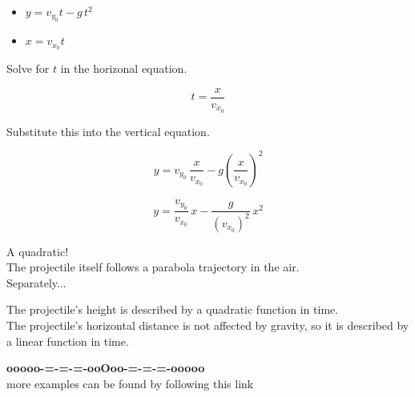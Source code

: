 \documentclass{ximera}
\begin{document}
\begin{itemize}
\item $y = v_{y_0} t - g \, t^2$


\item $x = v_{x_0} t$
\end{itemize}


Solve for $t$ in the horizonal equation.


\[ t = \frac{x}{v_{x_0}} \]

Substitute this into the vertical equation.


\[  y = v_{y_0} \, \frac{x}{v_{x_0}} - g \left(\frac{x}{v_{x_0}}\right)^2  \]



\[  y = \frac{v_{y_0}}{v_{x_0}} \, x  - \frac{g}{(v_{x_0})^2} \, x^2 \]



A quadratic! \\

The projectile itself follows a parabola trajectory in the air. \\


Separately...


The projectile's height is described by a quadratic function in time. \\


The projectile's horizontal distance is not affected by gravity, so it is described by a linear function in time. \\












\begin{center}
\textbf{\textcolor{green!50!black}{ooooo-=-=-=-ooOoo-=-=-=-ooooo}} \\

more examples can be found by following this link\\ 

\end{center}
\end{document}
